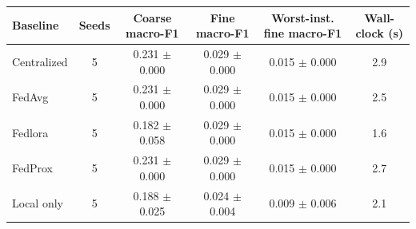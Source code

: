 \begin{tabular}{lccccc}
\toprule
Baseline & Seeds & Coarse macro-F1 & Fine macro-F1 & Worst-inst. fine macro-F1 & Wall-clock (s) \\
\midrule
Centralized & 5 & 0.231 $\pm$ 0.000 & 0.029 $\pm$ 0.000 & 0.015 $\pm$ 0.000 & 2.9 \\
FedAvg & 5 & 0.231 $\pm$ 0.000 & 0.029 $\pm$ 0.000 & 0.015 $\pm$ 0.000 & 2.5 \\
Fedlora & 5 & 0.182 $\pm$ 0.058 & 0.029 $\pm$ 0.000 & 0.015 $\pm$ 0.000 & 1.6 \\
FedProx & 5 & 0.231 $\pm$ 0.000 & 0.029 $\pm$ 0.000 & 0.015 $\pm$ 0.000 & 2.7 \\
Local only & 5 & 0.188 $\pm$ 0.025 & 0.024 $\pm$ 0.004 & 0.009 $\pm$ 0.006 & 2.1 \\
\bottomrule
\end{tabular}

